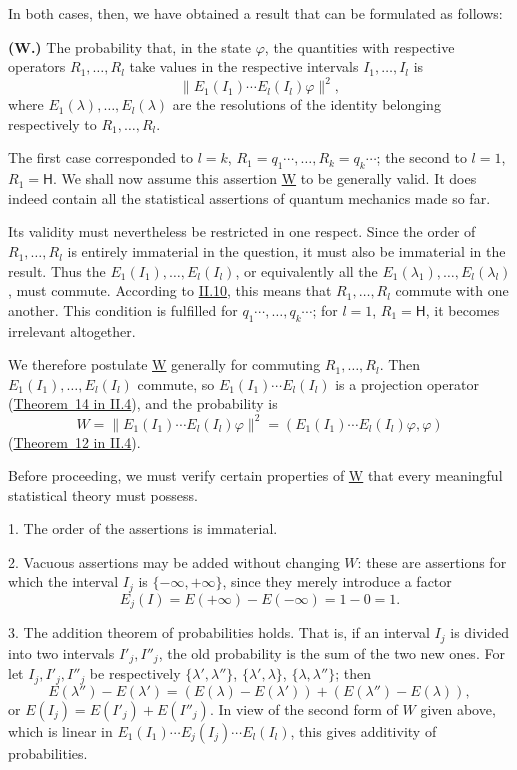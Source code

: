 \documentclass[fontsize=13pt,twoside,openany,headings=normal,parskip=false,bookmarkpackage=false,DIV=calc]{scrbook}
\begin{document}
In both cases, then, we have obtained a result that can be formulated as follows:

\leavevmode{}\label{post:III.1.W}\textbf{(W.)} The probability that, in the state $\varphi$, the quantities with respective operators $R_1,\ldots,R_l$ take values in the respective intervals $I_1,\ldots,I_l$ is
\[
\|E_1(I_1)\cdots E_l(I_l)\varphi\|^2,
\]
where $E_1(\lambda),\ldots,E_l(\lambda)$ are the resolutions of the identity belonging respectively to $R_1,\ldots,R_l$.

The first case corresponded to $l=k$, $R_1=q_1\cdots,\ldots,R_k=q_k\cdots$; the second to $l=1$, $R_1=\mathsf H$. We shall now assume this assertion \hyperref[post:III.1.W]{W} to be generally valid. It does indeed contain all the statistical assertions of quantum mechanics made so far.

Its validity must nevertheless be restricted in one respect. Since the order of $R_1,\ldots,R_l$ is entirely immaterial in the question, it must also be immaterial in the result. Thus the $E_1(I_1),\ldots,E_l(I_l)$, or equivalently all the $E_1(\lambda_1),\ldots,E_l(\lambda_l)$, must commute. According to \hyperref[sec:II.10]{II.10}, this means that $R_1,\ldots,R_l$ commute with one another. This condition is fulfilled for $q_1\cdots,\ldots,q_k\cdots$; for $l=1$, $R_1=\mathsf H$, it becomes irrelevant altogether.

We therefore postulate \hyperref[post:III.1.W]{W} generally for commuting $R_1,\ldots,R_l$. Then $E_1(I_1),\ldots,E_l(I_l)$ commute, so $E_1(I_1)\cdots E_l(I_l)$ is a projection operator (\hyperref[thm:II.14]{Theorem~14 in II.4}), and the probability is
\[
W=\|E_1(I_1)\cdots E_l(I_l)\varphi\|^2
=(E_1(I_1)\cdots E_l(I_l)\varphi,\varphi)
\]
(\hyperref[thm:II.12]{Theorem~12 in II.4}).

Before proceeding, we must verify certain properties of \hyperref[post:III.1.W]{W} that every meaningful statistical theory must possess.

1. The order of the assertions is immaterial.

2. Vacuous assertions may be added without changing $W$: these are assertions for which the interval $I_j$ is $\{-\infty,+\infty\}$, since they merely introduce a factor
\[
E_j(I)=E(+\infty)-E(-\infty)=1-0=1.
\]

3. The addition theorem of probabilities holds. That is, if an interval $I_j$ is divided into two intervals $I'_j,I''_j$, the old probability is the sum of the two new ones. For let $I_j,I'_j,I''_j$ be respectively $\{\lambda',\lambda''\}$, $\{\lambda',\lambda\}$, $\{\lambda,\lambda''\}$; then
\[
E(\lambda'')-E(\lambda')=(E(\lambda)-E(\lambda'))+(E(\lambda'')-E(\lambda)),
\]
or $E(I_j)=E(I'_j)+E(I''_j)$. In view of the second form of $W$ given above, which is linear in $E_1(I_1)\cdots E_j(I_j)\cdots E_l(I_l)$, this gives additivity of probabilities.
\end{document}
